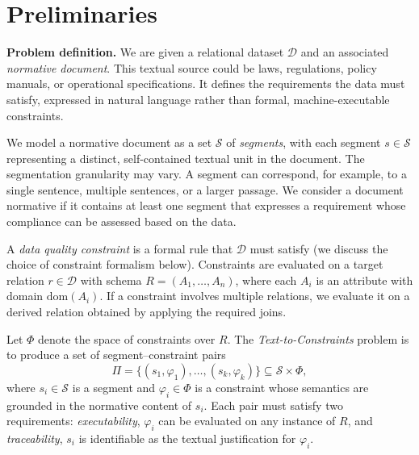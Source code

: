 \section{Preliminaries}
\label{sec:problem}

\smallskip\noindent\textbf{Problem definition.}
We are given a relational dataset $\mathcal{D}$ and an associated \emph{normative document}. This textual source could be laws, regulations, policy manuals, or operational specifications. It defines the requirements the data must satisfy, expressed in natural language rather than formal, machine-executable constraints.

We model a normative document as a set $\mathcal{S}$ of \emph{segments}, with each segment $s \in \mathcal{S}$ representing a distinct, self-contained textual unit in the document. The segmentation granularity may vary. A segment can correspond, for example, to a single sentence, multiple sentences, or a larger passage. We consider a document normative if it contains at least one segment that expresses a requirement whose compliance can be assessed based on the data.








A \emph{data quality constraint} is a formal rule that $\mathcal{D}$ must satisfy (we discuss the choice of constraint formalism below).
Constraints are evaluated on a target relation $r \in \mathcal{D}$ with schema $R = (A_1, \ldots, A_n)$, where each $A_i$ is an attribute with domain
$\mathrm{dom}(A_i)$. If a constraint involves multiple relations, we evaluate it on a derived relation obtained by applying the required joins.


Let $\Phi$ denote the space of constraints over $R$.
The \emph{Text-to-Constraints} problem is to produce a set of segment--constraint pairs
\[
\Pi = \{(s_1, \varphi_1), \ldots, (s_k, \varphi_k)\} \subseteq \mathcal{S} \times \Phi,
\]
where $s_i \in \mathcal{S}$ is a segment and $\varphi_i \in \Phi$ is a constraint whose semantics are grounded in the normative content of $s_i$.
Each pair must satisfy two requirements: \emph{executability}, ${\varphi_i}$ can be evaluated on any instance of $R$, 
and \emph{traceability}, $s_i$ is identifiable as the textual justification for $\varphi_i$.


